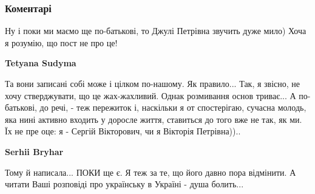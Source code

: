  
 
 
 
 
\subsubsection{Коментарі}
\label{sec:18_08_2021.fb.bryhar_sergej.1.progulka_imena.cmt}

\begin{itemize}
 
Ну і поки ми маємо ще по-батькові, то Джулі Петрівна звучить дуже мило) Хоча я розумію, що пост не про це!

\begin{itemize}
 
\textbf{Tetyana Sudyma} 

Та вони записані собі може і цілком по-нашому. Як
правило... Так, я звісно, не хочу стверджувати, що це жах-жахливий. Однак
розмивання основ триває... А по-батькові, до речі, - теж пережиток і, наскільки
я от спостерігаю, сучасна молодь, яка нині активно входить у доросле життя,
ставиться до того вже не так, як ми. Їх не пре оце: я - Сергій Вікторович, чи я
Вікторія Петрівна))..

 
\textbf{Serhii Bryhar} 

Тому й написала... ПОКИ ще є. Я теж за те, що його давно
пора відмінити. А читати Ваші розповіді про українську в Україні - душа
болить...


\end{itemize}
\end{itemize}
